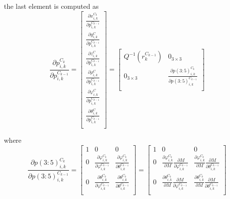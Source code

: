 \noindent the last element is computed as
\begin{equation}
\frac{\partial p_{i,k}^{C_{k }}}{\partial p_{i,k}^{C_{k-1 }}}=
\begin{bmatrix}
\frac{\partial x_{i,k}^{C_{k}}}{\partial p_{i,k}^{C_{k-1 }}} \\
\frac{\partial y_{i,k}^{C}}{\partial p_{i,k}^{C_{k-1 }}} \\
\frac{\partial z_{i,k}^{C}}{\partial p_{i,k}^{C_{k-1 }}} \\
\frac{\partial \rho _{i,k}^{C}}{\partial p_{i,k}^{C_{k-1 }}} \\
\frac{\partial \varphi _{i, k}^{C}}{\partial p_{i,k}^{C_{k-1 }}} \\
\frac{\partial \theta _{i, k}^{C}}{\partial p_{i,k}^{C_{k-1 }}} \\
\end{bmatrix}=\begin{bmatrix}
Q^{-1}(r_{k}^{C_{k-1}}) & 0_{3\times 3} \\
0_{3\times 3} & 
\frac{\partial p(3:5)_{i,k}^{C_{k}}}{\partial p(3:5)_{i,k}^{C_{k-1}}} \\
\end{bmatrix}
\end{equation}

\noindent where
\begin{equation}
\frac{\partial p(3:5)_{i,k}^{C_{k}}}{\partial p(3:5)_{i,k}^{C_{k-1}}}=
 \begin{bmatrix}
1 & 0 & 0 \\
0 & 
\frac{\partial \varphi_{i, k}^{C_{k}}}
{\partial \varphi_{i,k}^{C_{k-1}}} & 
\frac{\partial \varphi _{i, k}^{C_{k}}}
{\partial \theta _{i, k}^{C_{k-1}}} \\
0 & 
\frac{\partial \theta _{i, k}^{C_{k}}}
{\partial \varphi _{i, k}^{C_{k-1}}} & 
\frac{\partial \theta _{i, k}^{C_{k}}}
{\partial \theta _{i, k}^{C_{k-1}}} \\
\end{bmatrix}=\begin{bmatrix}
1 & 0 & 0 \\
0 & 
\frac{\partial \varphi _{i, k}^{C_{k}}}{\partial M}
\frac{\partial M}{\partial \varphi _{i, k}^{C_{k-1}}} & 
\frac{\partial \varphi _{i,k}^{C_{k}}}
{\partial M}\frac{\partial M}{\partial \theta _{i,k}^{C_{k-1}}}\\
0 & 
\frac{\partial \theta _{i, k}^{C_{k}}}{\partial M}
\frac{\partial M}{\partial \varphi _{i, k}^{C_{k-1}}} & 
\frac{\partial \theta _{i,k}^{C_{k}}}{\partial M}
\frac{\partial M}{\partial \theta _{i, k}^{C_{k-1}}} \\
\end{bmatrix}
\end{equation}

